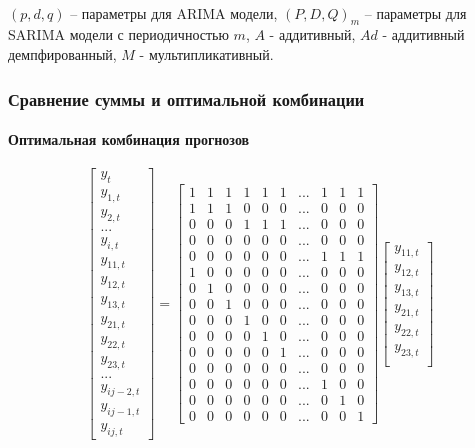 \documentclass[c, dvipsnames]{beamer}  %
\begin{document}
\begin{frame}[shrink=5]
\begin{table}[]
	\

$(p,d,q)$ -- параметры для ARIMA модели, $(P,D,Q)_{m}$ -- параметры для SARIMA модели с периодичностью $m$, $A$ - аддитивный, $Ad$ - аддитивный демпфированный, $M$ - мультипликативный. 


\end{table}


\end{frame}




\begin{frame}[shrink=5]
\frametitle{Сравнение суммы и оптимальной комбинации } 
\framesubtitle{Оптимальная комбинация прогнозов}

\begin{equation}\label{key123}
\begin{bmatrix}
y_{t} \\
y_{1, t} \\
y_{2, t} \\
... \\
y_{i, t} \\
y_{11, t} \\
y_{12, t} \\
y_{13, t} \\
y_{21, t} \\
y_{22, t} \\
y_{23, t} \\

... \\
y_{ij-2, t} \\
y_{ij-1, t} \\
y_{ij, t}
\end{bmatrix}
=
\begin{bmatrix}
1& 1 &1& 1& 1& 1& ... &1& 1& 1 \\
1 &1& 1& 0& 0& 0& ... &0 &0 &0  \\
0 &0 &0 &1& 1& 1& ... &0 &0 &0  \\
0& 0& 0& 0& 0& 0& ...&0 &0 &0 \\ 
0& 0& 0& 0& 0& 0& ...& 1& 1& 1 \\
1 &0 &0& 0& 0& 0& ...& 0& 0& 0 \\
0 &1 &0& 0& 0& 0& ...& 0& 0& 0 \\
0 &0 &1& 0& 0& 0& ...& 0& 0& 0 \\
0 &0 &0& 1& 0& 0& ...& 0& 0& 0 \\
0 &0 &0& 0& 1& 0& ...& 0& 0& 0 \\
0 &0 &0& 0& 0& 1& ...& 0& 0& 0 \\
0& 0& 0& 0& 0& 0& ...&0 &0 &0  \\ 
0 &0 &0& 0& 0& 0& ...& 1& 0& 0 \\
0 &0 &0& 0& 0& 0& ...& 0& 1& 0 \\
0 &0 &0& 0& 0& 0& ...& 0& 0& 1 
\end{bmatrix}
\begin{bmatrix}
y_{11, t} \\
y_{12, t} \\
y_{13, t} \\
y_{21, t} \\
y_{22, t} \\
y_{23, t} \\


\end{bmatrix}
\end{equation}
\end{frame}
\end{document}
